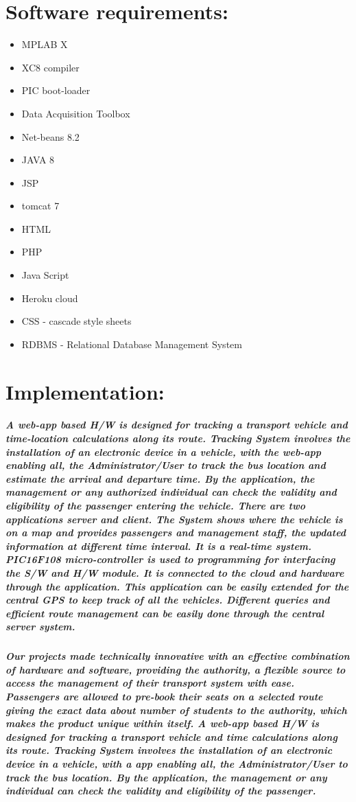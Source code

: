\documentclass[]{article}
\begin{document}
\section{Software requirements:}
\begin{itemize}
\item MPLAB X
\item XC8 compiler
\item PIC boot-loader
\item Data Acquisition Toolbox 
\item Net-beans 8.2
\item JAVA 8
\item JSP
\item tomcat 7
\item HTML
\item PHP
\item Java Script
\item Heroku cloud
\item CSS - cascade style sheets
\item RDBMS - Relational Database Management System	
\end{itemize}

\section{Implementation:}
\subparagraph{A web-app based H/W is designed for tracking a transport vehicle and time-location calculations along its route. Tracking System involves the installation of an electronic device in a vehicle, with the web-app enabling all, the Administrator/User to track the bus location and estimate the arrival and departure time. By the application, the management or any authorized individual can check the validity and eligibility of the passenger entering the vehicle. There are two applications server and client. The System shows where the vehicle is on a map and provides passengers and management staff, the updated information at different time interval. It is a real-time system. PIC16F108 micro-controller is used to programming for interfacing the S/W and H/W module. It is connected to the cloud and hardware through the application. This application can be easily extended for the central GPS to keep track of all the vehicles. Different queries and efficient route management can be easily done through the central server system.}

\subparagraph{Our projects made technically innovative with an effective combination of hardware and software, providing the authority, a flexible source to access the management of their transport system with ease. Passengers are allowed to pre-book their seats on a selected route giving the exact data about number of students to the authority, which makes the product unique within itself. A web-app based H/W is designed for tracking a transport vehicle and time calculations along its route. Tracking System involves the installation of an electronic device in a vehicle, with a app enabling all, the Administrator/User to track the bus location. By the application, the management or any individual can check the validity and eligibility of the passenger.}
\end{document}

